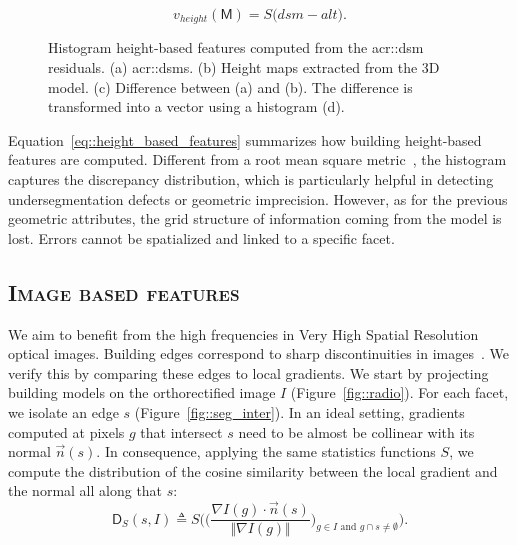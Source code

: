         \begin{equation}
            \label{eq::height_based_features}
            v_{height}(\mathsf{M}) = S\big( dsm - alt \big).
        \end{equation}
        \begin{figure}[H]
            
            \caption{
                \label{fig::height_based_features}
                Histogram height-based features computed from the \gls{acr::dsm} residuals.
                (a) \glspl{acr::dsm}.
                (b) Height maps extracted from the 3D model.
                (c) Difference between (a) and (b).
                The difference is transformed into a vector using a histogram (d).
            }
        \end{figure}
        Equation~\ref{eq::height_based_features} summarizes how building height-based features are computed. Different from a root mean square metric~\parencite{lafarge2012creating,poullis2013framework}, the histogram captures the discrepancy distribution, which is particularly helpful in detecting undersegmentation defects or geometric imprecision. However, as for the previous geometric attributes, the grid structure of information coming from the model is lost. Errors cannot be spatialized and linked to a specific facet.

    \subsection{\textsc{Image based features}}
        We aim to benefit from the high frequencies in Very High Spatial Resolution optical images. Building edges correspond to sharp discontinuities in images~\parencite{ortner2007building}. We verify this by comparing these edges to local gradients. We start by projecting building models on the orthorectified image $I$ (Figure~\ref{fig::radio}). For each facet, we isolate an edge $s$ (Figure~\ref{fig::seg_inter}). In an ideal setting, gradients computed at pixels $g$ that intersect $s$ need to be almost be collinear with its normal $\vec{n}(s)$. In consequence, applying the same statistics functions $S$, we compute the distribution of the cosine similarity between the local gradient and the normal all along that $s$:
        \begin{equation}
            \label{eq::corr_seg}
            \mathsf{D}_S(s, I) \triangleq S \bigg( \Big(\frac{\nabla I(g) \cdot \vec{n}(s)}{\Vert \nabla I(g)\Vert}\Big)_{g \in I \textrm{ and } g \cap s \neq \emptyset} \bigg).
        \end{equation}

